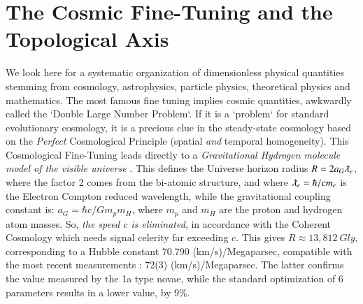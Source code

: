 \documentclass[twoside,draft]{article}
\begin{document}
\begin{sloppypar}
\section {The Cosmic Fine-Tuning and the Topological Axis}

We look here for a systematic organization of dimensionless physical quantities stemming from cosmology, astrophysics, particle   physics, theoretical physics and mathematics. The most famous fine tuning implies cosmic quantities, awkwardly called the `Double Large Number Problem`. If it is a `problem` for standard evolutionary cosmology, it is a precious clue in the steady-state cosmology based on the \textit{Perfect} Cosmological Principle (spatial \textit{and} temporal homogeneity).
This Cosmological Fine-Tuning leads directly to a \textit{Gravitational Hydrogen molecule model of the visible universe} \cite{Sanchez1}.
This defines the Universe horizon radius $R = 2a_{G} \lambdabar_{e}$, where the factor 2 comes from the bi-atomic structure, and where $\lambdabar_{e} = \hbar/cm_{e}$ is the Electron Compton reduced wavelength, while the gravitational coupling constant is: $a_{G} = \hbar c/Gm_{p}m_{H}$, where $m_p$ and $m_H$ are the proton and hydrogen atom masses. So, \textit{the speed $c$ is eliminated}, in accordance with the Coherent Cosmology which needs signal celerity far exceeding $c$. This gives $R \approx 13,812~Gly $, corresponding to a Hubble constant 70.790 (km/s)/Megaparsec, compatible with the most recent measurements \cite{Bonvin}: 72(3) (km/s)/Megaparsec. The latter confirms the value measured by the 1a type novae, while the standard optimization of 6 parameters results in a lower value, by $9\%$.


\end{sloppypar}
\end{document}
